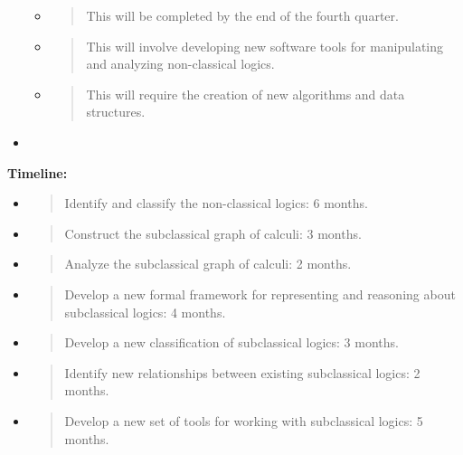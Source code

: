 \begin{itemize}
  \begin{itemize}
  \item
    \begin{quote}
    This will be completed by the end of the fourth quarter.
    \end{quote}
  \item
    \begin{quote}
    This will involve developing new software tools for manipulating and
    analyzing non-classical logics.
    \end{quote}
  \item
    \begin{quote}
    This will require the creation of new algorithms and data
    structures.
    \end{quote}
  \end{itemize}
\item
\end{itemize}

\textbf{Timeline:}

\begin{itemize}
\item
  \begin{quote}
  Identify and classify the non-classical logics: 6 months.
  \end{quote}
\item
  \begin{quote}
  Construct the subclassical graph of calculi: 3 months.
  \end{quote}
\item
  \begin{quote}
  Analyze the subclassical graph of calculi: 2 months.
  \end{quote}
\item
  \begin{quote}
  Develop a new formal framework for representing and reasoning about
  subclassical logics: 4 months.
  \end{quote}
\item
  \begin{quote}
  Develop a new classification of subclassical logics: 3 months.
  \end{quote}
\item
  \begin{quote}
  Identify new relationships between existing subclassical logics: 2
  months.
  \end{quote}
\item
  \begin{quote}
  Develop a new set of tools for working with subclassical logics: 5
  months.
  \end{quote}
\end{itemize}

